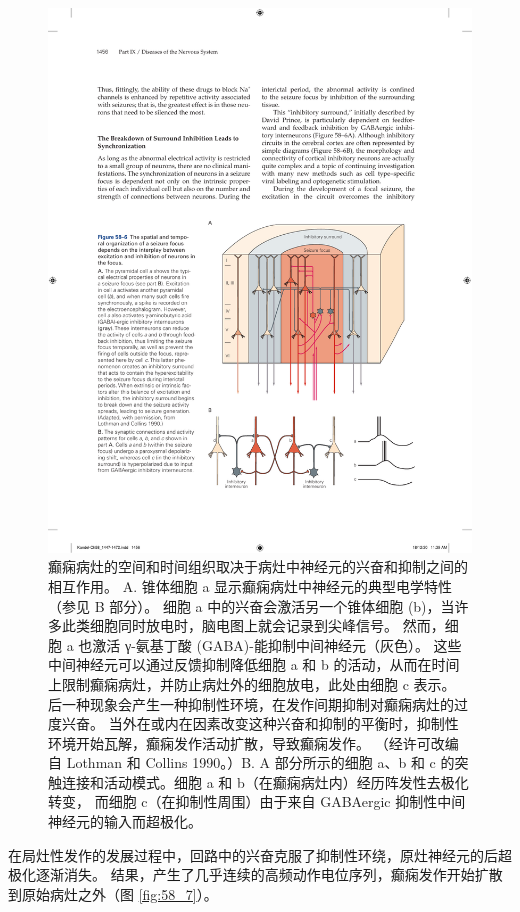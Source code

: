 \begin{figure}[htbp]
	\centering
	\includegraphics[width=0.7\linewidth]{chap58/fig_58_6}
	\caption{癫痫病灶的空间和时间组织取决于病灶中神经元的兴奋和抑制之间的相互作用。 A. 锥体细胞 a 显示癫痫病灶中神经元的典型电学特性（参见 B 部分）。 细胞 a 中的兴奋会激活另一个锥体细胞 (b)，当许多此类细胞同时放电时，脑电图上就会记录到尖峰信号。 然而，细胞 a 也激活 γ-氨基丁酸 (GABA)-能抑制中间神经元（灰色）。 这些中间神经元可以通过反馈抑制降低细胞 a 和 b 的活动，从而在时间上限制癫痫病灶，并防止病灶外的细胞放电，此处由细胞 c 表示。 后一种现象会产生一种抑制性环境，在发作间期抑制对癫痫病灶的过度兴奋。 当外在或内在因素改变这种兴奋和抑制的平衡时，抑制性环境开始瓦解，癫痫发作活动扩散，导致癫痫发作。 （经许可改编自 Lothman 和 Collins 1990。）B. A 部分所示的细胞 a、b 和 c 的突触连接和活动模式。细胞 a 和 b（在癫痫病灶内）经历阵发性去极化转变， 而细胞 c（在抑制性周围）由于来自 GABAergic 抑制性中间神经元的输入而超极化。}
	\label{fig:58_6}
\end{figure}


在局灶性发作的发展过程中，回路中的兴奋克服了抑制性环绕，原灶神经元的后超极化逐渐消失。
结果，产生了几乎连续的高频动作电位序列，癫痫发作开始扩散到原始病灶之外（图 \ref{fig:58_7}）。


